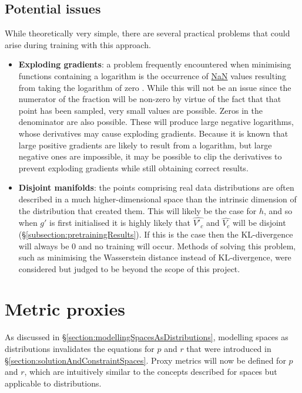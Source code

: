 \documentclass[../../main.tex]{subfiles}
\begin{document}
\subsection{Potential issues} \label{subsection:potentialIssues}

While theoretically very simple, there are several practical problems that could arise during training with this approach.
\begin{itemize}
    \item[] \textbf{Exploding gradients}: a problem frequently encountered when minimising functions containing a logarithm is the occurrence of \url{NaN} values resulting from taking the logarithm of zero \cite{bengio94}.
    While this will not be an issue since the numerator of the fraction will be non-zero by virtue of the fact that that point has been sampled, very small values are possible.
    Zeros in the denominator are also possible.
    These will produce large negative logarithms, whose derivatives may cause exploding gradients.
    Because it is known that large positive gradients are likely to result from a logarithm, but large negative ones are impossible, it may be possible to clip the derivatives to prevent exploding gradients while still obtaining correct results.   
    \item[] \textbf{Disjoint manifolds}: the points comprising real data distributions are often described in a much higher-dimensional space than the intrinsic dimension of the distribution that created them.
    This will likely be the case for $h$, and so when $g'$ is first initialised it is highly likely that $\hat{V'_c}$ and $\hat{V_c}$ will be disjoint (\S\ref{subsection:pretrainingResults}).
    If this is the case then the KL-divergence will always be 0 and no training will occur.
    Methods of solving this problem, such as minimising the Wasserstein distance instead of KL-divergence, were considered but judged to be beyond the scope of this project.
\end{itemize}

\section{Metric proxies} \label{section:metricProxies}

As discussed in \S\ref{section:modellingSpacesAsDistributions}, modelling spaces as distributions invalidates the equations for $p$ and $r$ that were introduced in \S\ref{section:solutionAndConstraintSpaces}.
Proxy metrics will now be defined for $p$ and $r$, which are intuitively similar to the concepts described for spaces but applicable to distributions.
\end{document}
